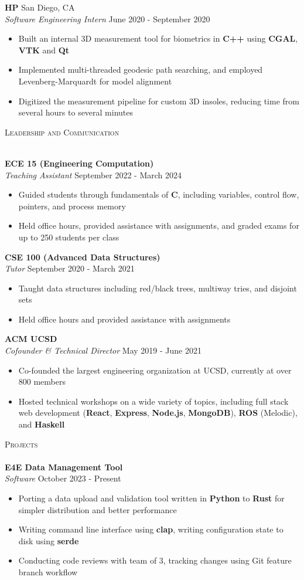 \documentclass[a4paper]{article}
\newcommand{\lineunder} {
    \vspace*{-8pt} \\
    \hspace*{-18pt} \hrulefill \\
}
\newcommand{\header} [1] {
    {\hspace*{-18pt}\vspace*{6pt} \textsc{#1}}
    \vspace*{-6pt} \lineunder
}
\newenvironment{entry}[4][]{
  \textbf{#2} \hfill #1 \\
  \textit{#3} \hfill #4 \\
  \vspace{-2mm}
  \begin{itemize} \itemsep 0em
  }
  {
  \end{itemize}
}
\begin{document}
\begin{entry}[San Diego, CA]{HP}{Software Engineering Intern}{June 2020 -
    September 2020}
\item Built an internal 3D measurement tool for biometrics in \textbf{C++} using \textbf{CGAL}, \textbf{VTK} and \textbf{Qt}
\item Implemented multi-threaded geodesic path searching, and employed
  Levenberg-Marquardt for model alignment
\item Digitized the measurement pipeline for custom 3D insoles, reducing time from several hours to several minutes
\end{entry}
\pagebreak

\header{Leadership and Communication}
\vspace{1mm}

\begin{entry}{ECE 15 (Engineering Computation)}{Teaching Assistant}{September 2022 - March 2024}
  \item Guided students through fundamentals of \textbf{C},
    including variables, control flow, pointers, and process memory
  \item Held office hours, provided assistance with assignments, and graded exams for up to 250 students per class
\end{entry}

\begin{entry}{CSE 100 (Advanced Data Structures)}{Tutor}{September 2020 - March 2021}
  \item Taught data structures including red/black trees, multiway tries, and disjoint sets
  \item Held office hours and provided assistance with assignments
\end{entry}

\begin{entry}{ACM UCSD}{Cofounder \& Technical Director}{May 2019 - June 2021}
  \item Co-founded the largest engineering organization at UCSD, currently at over 800 members
  \item Hosted technical workshops on a wide variety of topics, including full
    stack web development (\textbf{React}, \textbf{Express}, \textbf{Node.js}, \textbf{MongoDB}), \textbf{ROS} (Melodic), and \textbf{Haskell}
\end{entry}

\header{Projects}
\begin{entry}{E4E Data Management Tool}{Software}{October 2023 - Present}
\item Porting a data upload and validation tool written in \textbf{Python} to \textbf{Rust} for simpler distribution and better performance
\item Writing command line interface using \textbf{clap}, writing configuration state to disk using \textbf{serde}
\item Conducting code reviews with team of 3, tracking changes using Git feature branch workflow
\end{entry}
\end{document}

